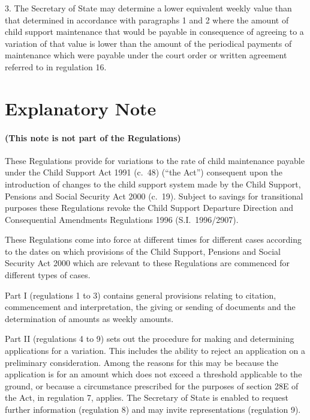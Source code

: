 \documentclass[12pt,a4paper]{article}
\begin{document}
\medskip

3.  The Secretary of State may determine a lower equivalent weekly value than that determined in accordance with paragraphs 1 and 2 where the amount of child support maintenance that would be payable in consequence of agreeing to a variation of that value is lower than the amount of the periodical payments of maintenance which were payable under the court order or written agreement referred to in regulation 16. 

\part{Explanatory Note}

\renewcommand\parthead{— Explanatory Note}

\subsection*{(This note is not part of the Regulations)}

These Regulations provide for variations to the rate of child maintenance payable under the Child Support Act 1991 (c.\ 48) (“the Act”) consequent upon the introduction of changes to the child support system made by the Child Support, Pensions and Social Security Act 2000 (c.\ 19). Subject to savings for transitional purposes these Regulations revoke the Child Support Departure Direction and Consequential Amendments Regulations 1996 (S.I.\ 1996/2907).

These Regulations come into force at different times for different cases according to the dates on which provisions of the Child Support, Pensions and Social Security Act 2000 which are relevant to these Regulations are commenced for different types of cases.

Part I (regulations 1 to 3) contains general provisions relating to citation, commencement and interpretation, the giving or sending of documents and the determination of amounts as weekly amounts.

Part II (regulations 4 to 9) sets out the procedure for making and determining applications for a variation. This includes the ability to reject an application on a preliminary consideration. Among the reasons for this may be because the application is for an amount which does not exceed a threshold applicable to the ground, or because a circumstance prescribed for the purposes of section 28E of the Act, in regulation 7, applies. The Secretary of State is enabled to request further information (regulation 8) and may invite representations (regulation 9).
\end{document}
